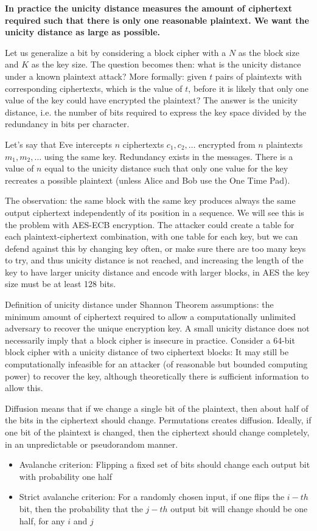 \textbf{In practice the unicity distance measures the amount of ciphertext required such that there is only one reasonable plaintext.
We want the unicity distance as large as possible.}

Let us generalize a bit by considering a block cipher with a $N$ as the block size and $K$ as the key size. The question becomes then: what is the unicity distance under a known plaintext attack? More formally: given $t$ pairs of plaintexts with corresponding ciphertexts, which is the value of $t$, before it is likely that only one value of the key could have encrypted the plaintext? The answer is the unicity distance, i.e. the number of bits required to express the key space divided by the redundancy in bits per character.

Let's say that Eve intercepts $n$ ciphertexts $c_1, c_2,\ldots$ encrypted from $n$ plaintexts $m_1, m_2,\ldots$ using the same key. Redundancy exists in the messages. There is a value of $n$ equal to the unicity distance such that only one value for the key recreates a possible plaintext (unless Alice and Bob use the One Time Pad).

The observation: the same block with the same key produces always the same output ciphertext independently of its position in a sequence. We will see this is the problem with AES-ECB encryption. The attacker could create a table for each plaintext-ciphertext combination, with one table for each key, but we can defend against this by changing key often, or make sure there are too many keys to try, and thus unicity distance is not reached, and increasing the length of the key to have larger unicity distance and encode with larger blocks, in AES the key size must be at least 128 bits.

Definition of unicity distance under Shannon Theorem assumptions: the minimum amount of ciphertext required to allow a computationally unlimited adversary to recover the unique encryption key. A small unicity distance does not necessarily imply that a block cipher is insecure in practice. Consider a 64-bit block cipher with a unicity distance of two ciphertext blocks: It may still be computationally infeasible for an attacker (of reasonable but bounded computing power) to recover the key, although theoretically there is sufficient information to allow this.

Diffusion means that if we change a single bit of the plaintext, then about half of the bits in the ciphertext should change. Permutations creates diffusion. Ideally, if one bit of the plaintext is changed, then the ciphertext should change completely, in an unpredictable or pseudorandom manner. 
\begin{itemize}
	\item Avalanche criterion: Flipping a fixed set of bits should change each output bit with probability one half
	\item Strict avalanche criterion: For a randomly chosen input, if one flips the $i-th$ bit, then the probability that the $j-th$ output bit will change should be one half, for any $i$ and $j$
\end{itemize}


